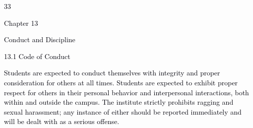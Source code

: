 \documentclass[12pt]{article}
\begin{document}
\vspace{\baselineskip}

\vspace{\baselineskip}

\vspace{\baselineskip}

\vspace{\baselineskip}

\vspace{\baselineskip}

\vspace{\baselineskip}

\vspace{\baselineskip}

\vspace{\baselineskip}

\vspace{\baselineskip}

\vspace{\baselineskip}

\vspace{\baselineskip}

\vspace{\baselineskip}
\begin{Center}
\textcolor[HTML]{00000A}{33}
\end{Center}\par


\vspace{\baselineskip}
{\fontsize{14pt}{16.8pt}\selectfont \textcolor[HTML]{00000A}{Chapter 13}\par}\par


\vspace{\baselineskip}
{\fontsize{20pt}{24.0pt}\selectfont \textcolor[HTML]{00000A}{Conduct and Discipline}\par}\par


\vspace{\baselineskip}
\textcolor[HTML]{00000A}{13.1 Code of Conduct}\par


\vspace{\baselineskip}
\begin{justify}
{\fontsize{10pt}{12.0pt}\selectfont \textcolor[HTML]{00000A}{Students are expected to conduct themselves with integrity and proper consideration for others at all times. Students are expected to exhibit proper respect for others in their personal behavior and interpersonal interactions, both within and outside the campus. The institute strictly prohibits ragging and sexual harassment; any instance of either should be reported immediately and will be dealt with as a serious offense.}\par}
\end{justify}\par
\end{document}
